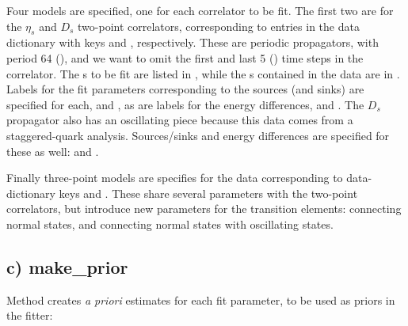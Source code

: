 \documentclass[letterpaper,10pt,english]{sphinxmanual}
\begin{document}
Four models are specified, one for each correlator to be fit. The first two
are for the \(\eta_s\) and \(D_s\) two-point correlators, corresponding to
entries in the data dictionary with keys  and ,
respectively. These are periodic propagators, with period 64 (), and we want to
omit the first and last 5 () time steps in the correlator. The
s to be fit are listed in , while the s contained in the
data are in . Labels for the fit parameters corresponding to the
sources (and sinks) are specified for each,  and , as
are labels for the energy differences,  and .  The
\(D_s\) propagator also has an oscillating piece because this data comes from
a staggered-quark analysis. Sources/sinks and energy differences are
specified for these as well:  and .

Finally three-point models are specifies for the data corresponding to
data-dictionary keys  and . These share several
parameters with the two-point correlators, but introduce new parameters
for the transition elements:  connecting normal states, and
 connecting normal states with oscillating states.


\subsection{c) make\_prior}
\label{corrfitter:id5}
Method  creates \emph{a priori} estimates for each fit
parameter, to be used as priors in the fitter:
\end{document}
